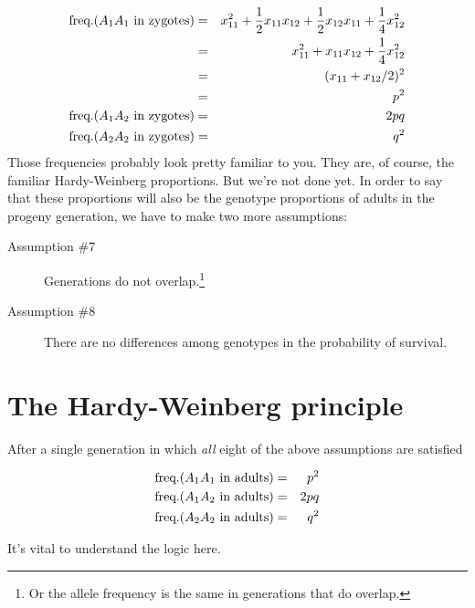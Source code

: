 \documentclass[12pt]{article}
\begin{document}
\begin{eqnarray*}
\hbox{freq.}(A_1A_1\hbox{ in zygotes}) &=&
   x_{11}^2 + \frac{1}{2}x_{11}x_{12} + \frac{1}{2}x_{12}x_{11}
   + \frac{1}{4}x_{12}^2 \\
&=& x_{11}^2 + x_{11}x_{12} + \frac{1}{4}x_{12}^2 \\
&=& (x_{11} + x_{12}/2)^2 \\
&=& p^2 \\
\hbox{freq.}(A_1A_2\hbox{ in zygotes}) &=& 2pq \\
\hbox{freq.}(A_2A_2\hbox{ in zygotes}) &=& q^2 \\
\end{eqnarray*}
Those frequencies probably look pretty familiar to you. They are, of
course, the familiar Hardy-Weinberg proportions. But we're not done
yet. In order to say that these proportions will also be the genotype
proportions of adults in the progeny generation, we have to make two
more assumptions:

\begin{description}

\item[Assumption \#7] Generations do not overlap.\footnote{Or the
    allele frequency is the same in generations that do overlap.}

\item[Assumption \#8] There are no differences among genotypes in the
probability of survival.

\end{description}

\section*{The Hardy-Weinberg principle}

After a single generation in which {\it all\/} eight of the above
assumptions are satisfied

\begin{eqnarray}
\hbox{freq.}(A_1A_1\hbox{ in adults}) &=& p^2 \label{eq:hw-p2} \\
\hbox{freq.}(A_1A_2\hbox{ in adults}) &=& 2pq \label{eq:hw-2pq} \\
\hbox{freq.}(A_2A_2\hbox{ in adults}) &=& q^2 \label{eq:hw-q2}
\end{eqnarray}

\noindent It's vital to understand the logic here.
\end{document}
